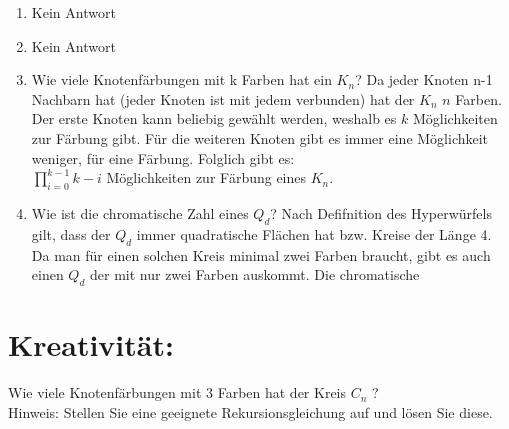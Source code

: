 \begin{enumerate}[label=(\alph*)]
        \item Kein Antwort
        
        \item Kein Antwort

        \item Wie viele Knotenfärbungen mit k Farben hat ein $K_n$?
        Da jeder Knoten n-1 Nachbarn hat (jeder Knoten ist mit jedem verbunden) hat der $K_n$ $n$ Farben. 
        Der erste Knoten kann beliebig gewählt werden, weshalb es $k$ Möglichkeiten zur Färbung gibt. 
        Für die weiteren Knoten gibt es immer eine Möglichkeit weniger, für eine Färbung. Folglich gibt es: \\
        $\prod_{i=0}^{k-1} k - i$ Möglichkeiten zur Färbung eines $K_n$.
          
        \item Wie ist die chromatische Zahl eines $Q_d$?
        Nach Defifnition des Hyperwürfels gilt, dass der $Q_d$ immer quadratische Flächen hat bzw. Kreise der Länge 4. Da man für einen solchen Kreis minimal zwei Farben braucht, gibt es auch einen $Q_d$ der mit nur zwei Farben auskommt. Die chromatische
        
    \end{enumerate}
    \section*{Kreativität:} Wie viele Knotenfärbungen mit 3 Farben hat der Kreis $C_n$ ?\\
    Hinweis: Stellen Sie eine geeignete Rekursionsgleichung auf und lösen Sie diese.\\\\
        
